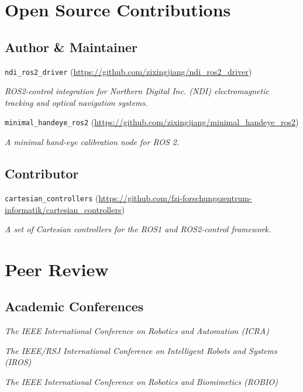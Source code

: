 \documentclass[11pt,letterpaper]{report}
\newcommand{\listitemspace}{0.25em}
\renewenvironment{itemize}
{\begin{list}{}{\setlength{\leftmargin}{0em}
			\setlength{\parskip}{0em}
			\setlength{\itemsep}{\listitemspace}
			\setlength{\parsep}{\listitemspace}}}
	{\end{list}}
\begin{document}
\section*{Open Source Contributions}
\subsection*{Author \& Maintainer}
\begin{itemize}
	\item \texttt{ndi\_ros2\_driver} (\href{https://github.com/zixingjiang/ndi_ros2_driver}{https://github.com/zixingjiang/ndi\_ros2\_driver})
	
	\textit{ROS2-control integration for Northern Digital Inc. (NDI) electromagnetic tracking and optical navigation systems.}
	
	\item \texttt{minimal\_handeye\_ros2} (\href{https://github.com/zixingjiang/minimal_handeye_ros2}{https://github.com/zixingjiang/minimal\_handeye\_ros2})
	
	\textit{A minimal hand-eye calibration node for ROS 2.}
\end{itemize}
\subsection*{Contributor}
\begin{itemize}
	\item \texttt{cartesian\_controllers} (\href{https://github.com/fzi-forschungszentrum-informatik/cartesian_controllers}{https://github.com/fzi-forschungszentrum-informatik/cartesian\_controllers})
	
	\textit{A set of Cartesian controllers for the ROS1 and ROS2-control framework.}
\end{itemize}
	
\section*{Peer Review}
\subsection*{Academic Conferences}
\begin{itemize}
	\item \textit{The IEEE International Conference on Robotics and Automation (ICRA)}
	\item \textit{The IEEE/RSJ International Conference	on Intelligent Robots and Systems (IROS)}
	\item \textit{The IEEE International Conference on Robotics and Biomimetics (ROBIO)}
\end{itemize}
	
\end{document}
